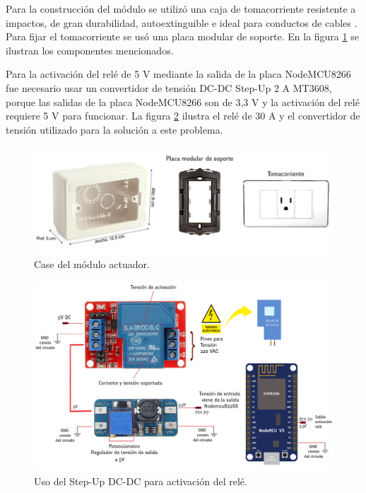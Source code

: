 Para la construcción del módulo se utilizó una caja de tomacorriente  resistente a impactos, de gran durabilidad, autoextinguible e ideal para conductos de cables \citep{WEBSITE:18}. Para fijar el tomacorriente se usó una placa modular de soporte. En la figura \ref{fig:caseactuador} se ilustran los componentes mencionados.


Para la activación del relé de 5 V mediante la salida de la placa NodeMCU8266 fue necesario usar un convertidor de tensión DC-DC Step-Up 2 A MT3608, porque las salidas de la placa NodeMCU8266 son de 3,3 V y la activación del relé requiere 5 V para funcionar. La figura \ref{fig:esquemaactuador} ilustra el relé de 30 A y el convertidor de tensión utilizado para la solución a este problema.




\begin{figure}[htpb]
\centering 
\includegraphics[width=1.0\textwidth]{./Figures/actuador.jpg}
\caption{Case del módulo actuador.}
\label{fig:caseactuador}
\end{figure}


\begin{figure}[htpb]
\centering 
\includegraphics[width=1.0\textwidth]{./Figures/esquemaactuador.png}
\caption{Uso del Step-Up DC-DC para activación del relé. }
\label{fig:esquemaactuador}
\end{figure}

